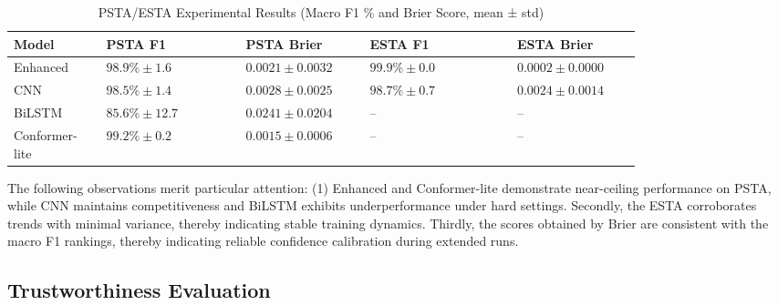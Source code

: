 \documentclass[journal]{IEEEtran}
\begin{document}
\begin{table}[t]
\centering
\caption{PSTA/ESTA Experimental Results (Macro F1 \% and Brier Score, mean ± std)}
\label{tab:d5d6}
\begin{tabular}{p{0.11\linewidth} p{0.18\linewidth} p{0.16\linewidth} p{0.19\linewidth} p{0.16\linewidth}}
\toprule
Model & PSTA F1 & PSTA Brier & ESTA F1 & ESTA Brier \\ \midrule
Enhanced & $98.9\% \pm 1.6$ & $0.0021 \pm 0.0032$ & $99.9\% \pm 0.0$ & $0.0002 \pm 0.0000$ \\ 
        CNN & $98.5\% \pm 1.4$ & $0.0028 \pm 0.0025$ & $98.7\% \pm 0.7$ & $0.0024 \pm 0.0014$ \\ 
        BiLSTM & $85.6\% \pm 12.7$ & $0.0241 \pm 0.0204$ & -- & -- \\ 
        Conformer-lite & $99.2\% \pm 0.2$ & $0.0015 \pm 0.0006$ & -- & -- \\ 
\bottomrule
\end{tabular}
\end{table}

The following observations merit particular attention: (1) Enhanced and Conformer-lite demonstrate near-ceiling performance on PSTA, while CNN maintains competitiveness and BiLSTM exhibits underperformance under hard settings. Secondly, the ESTA corroborates trends with minimal variance, thereby indicating stable training dynamics. Thirdly, the scores obtained by Brier are consistent with the macro F1 rankings, thereby indicating reliable confidence calibration during extended runs.


\subsection{Trustworthiness Evaluation}
\end{document}
